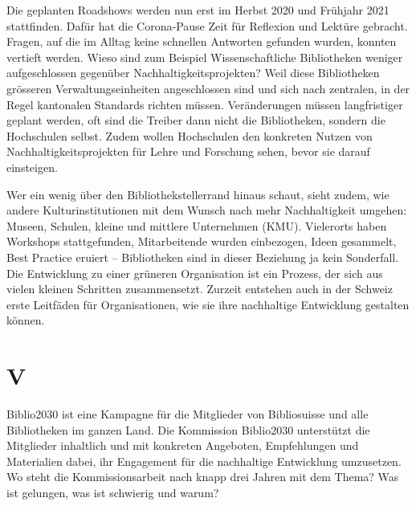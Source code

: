 \documentclass[a4paper,
fontsize=11pt,
oneside,
numbers=noperiodatend,
parskip=half-,
bibliography=totoc,
final
]{scrartcl}
\begin{document}
Die geplanten Roadshows werden nun erst im Herbst 2020 und Frühjahr 2021
stattfinden. Dafür hat die Corona-Pause Zeit für Reflexion und Lektüre
gebracht. Fragen, auf die im Alltag keine schnellen Antworten gefunden
wurden, konnten vertieft werden. Wieso sind zum Beispiel
Wissenschaftliche Bibliotheken weniger aufgeschlossen gegenüber
Nachhaltigkeitsprojekten? Weil diese Bibliotheken grösseren
Verwaltungseinheiten angeschlossen sind und sich nach zentralen, in der
Regel kantonalen Standards richten müssen. Veränderungen müssen
langfristiger geplant werden, oft sind die Treiber dann nicht die
Bibliotheken, sondern die Hochschulen selbst. Zudem wollen Hochschulen
den konkreten Nutzen von Nachhaltigkeitsprojekten für Lehre und
Forschung sehen, bevor sie darauf einsteigen.

Wer ein wenig über den Bibliothekstellerrand hinaus schaut, sieht zudem,
wie andere Kulturinstitutionen mit dem Wunsch nach mehr Nachhaltigkeit
umgehen: Museen, Schulen, kleine und mittlere Unternehmen (KMU).
Vielerorts haben Workshops stattgefunden, Mitarbeitende wurden
einbezogen, Ideen gesammelt, Best Practice eruiert -- Bibliotheken sind
in dieser Beziehung ja kein Sonderfall. Die Entwicklung zu einer
grüneren Organisation ist ein Prozess, der sich aus vielen kleinen
Schritten zusammensetzt. Zurzeit entstehen auch in der Schweiz erste
Leitfäden für Organisationen, wie sie ihre nachhaltige Entwicklung
gestalten können.

\hypertarget{v}{%
\section{V}\label{v}}

Biblio2030 ist eine Kampagne für die Mitglieder von Bibliosuisse und
alle Bibliotheken im ganzen Land. Die Kommission Biblio2030 unterstützt
die Mitglieder inhaltlich und mit konkreten Angeboten, Empfehlungen und
Materialien dabei, ihr Engagement für die nachhaltige Entwicklung
umzusetzen. Wo steht die Kommissionsarbeit nach knapp drei Jahren mit
dem Thema? Was ist gelungen, was ist schwierig und warum?
\end{document}
